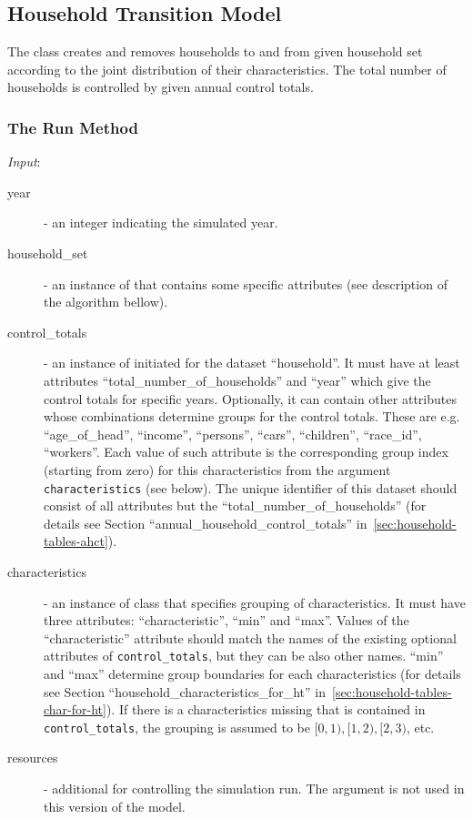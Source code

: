 %
\subsection{Household Transition Model}
\modelsindex
%
\label{sec:household-transition-model}
 \modelsindex The class  \modelsindex
creates and removes households to and from given household set according to
the joint distribution of their characteristics. The total number of
households is controlled by given annual control totals.

\subsubsection{The Run Method}
%
{\it Input}:
\begin{description}
\item[year] - an integer indicating the simulated year.
\item[household_set] - an instance of  \datasetindex that contains some
  specific attributes \attributesindex (see description of the algorithm bellow).
\item[control_totals] - an instance of  initiated for
  the dataset ``household''. It must have at least attributes \attributesindex
  ``total_number_of_households'' and ``year'' which give the control totals
  for specific years. Optionally, it can contain other attributes \attributesindex whose
  combinations determine groups for the control totals.  These are e.g.
  ``age_of_head'', ``income'', ``persons'', ``cars'', ``children'',
  ``race_id'', ``workers''. Each value of such attribute \attributesindex is the corresponding
  group index (starting from zero) for this characteristics from the argument
  \verb|characteristics| (see below). The unique identifier of this dataset \datasetindex
  should consist of all attributes \attributesindex but the ``total_number_of_households'' (for
  details see Section ``annual_household_control_totals''
  in~\ref{sec:household-tables-ahct}).
\item[characteristics] - an instance of class
   that specifies grouping of
  characteristics.  It must have three attributes: \attributesindex ``characteristic'', ``min''
  and ``max''.  Values of the ``characteristic'' attribute \attributesindex should match the
  names of the existing optional attributes of \verb|control_totals|, but they
  can be also other names. ``min'' and ``max'' determine group boundaries for
  each characteristics (for details see Section
  ``household_characteristics_for_ht'' in~\ref{sec:household-tables-char-for-ht}). If
  there is a characteristics missing that is contained in
  \verb|control_totals|, the grouping is assumed to be $[0,1), [1,2), [2,3)$,
  etc.
\item[resources] - additional  for controlling the
  simulation run. The argument is not used in this version of the model. \modelsindex
\end{description}

